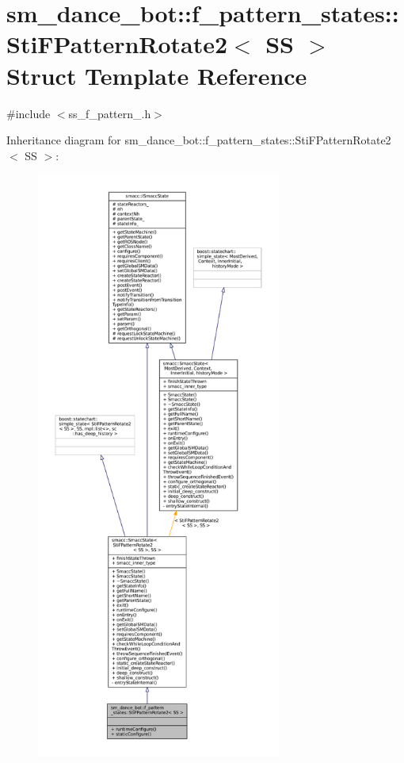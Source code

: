 \hypertarget{classsm__dance__bot_1_1f__pattern__states_1_1StiFPatternRotate2}{}\section{sm\+\_\+dance\+\_\+bot\+:\+:f\+\_\+pattern\+\_\+states\+:\+:Sti\+F\+Pattern\+Rotate2$<$ SS $>$ Struct Template Reference}
\label{classsm__dance__bot_1_1f__pattern__states_1_1StiFPatternRotate2}


{\ttfamily \#include $<$ss\+\_\+f\+\_\+pattern\+\_.\+h$>$}



Inheritance diagram for sm\+\_\+dance\+\_\+bot\+:\+:f\+\_\+pattern\+\_\+states\+:\+:Sti\+F\+Pattern\+Rotate2$<$ SS $>$\+:
\nopagebreak
\begin{figure}[H]
\begin{center}
\leavevmode
\includegraphics[height=550pt]{classsm__dance__bot_1_1f__pattern__states_1_1StiFPatternRotate2__inherit__graph}
\end{center}
\end{figure}


